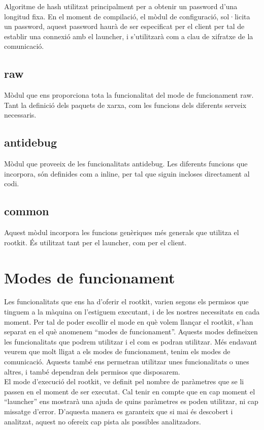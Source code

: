 Algoritme de hash utilitzat principalment per a obtenir un password d'una longitud fixa. En el moment
de compilació, el mòdul de configuració, sol·licita un password, aquest password haurà de ser especificat
per el client per tal de establir una connexió amb el launcher, i s'utilitzarà com a clau de xifratxe
de la comunicació.

\subsection{raw}

Mòdul que ens proporciona tota la funcionalitat del mode de funcionament raw. Tant la definició dels
paquets de xarxa, com les funcions dels diferents serveix necessaris.

\subsection{antidebug}

Mòdul que proveeix de les funcionalitats antidebug. Les diferents funcions que incorpora, són definides
com a inline, per tal que siguin incloses directament al codi.

\subsection{common}

Aquest mòdul incorpora les funcions genèriques més generals que utilitza el rootkit. És utilitzat tant per
el launcher, com per el client.

\section{Modes de funcionament}

Les funcionalitats que ens ha d'oferir el rootkit, varien segons els permisos que tinguem a la màquina on
l'estiguem executant, i de les nostres necessitats en cada moment. Per tal de poder escollir el mode 
en què volem llançar el rootkit, s'han separat en el què anomenem ``modes de funcionament''. 
Aquests modes defineixen les funcionalitats que podrem utilitzar i el com es podran utilitzar. Més endavant 
veurem que molt lligat a els modes de funcionament, tenim els modes de comunicació. Aquests també ens
permetran utilitzar unes funcionalitats o unes altres, i també dependran dels permisos que disposarem. \\

El mode d'execució del rootkit, ve definit pel nombre de paràmetres que se li passen en el moment de ser
executat. Cal tenir en compte que en cap moment el ``launcher'' ens mostrarà una ajuda de quins paràmetres 
es poden utilitzar, ni cap missatge d'error. D'aquesta manera es garanteix que si mai és descobert i analitzat, 
aquest no ofereix cap pista als possibles analitzadors. \\

